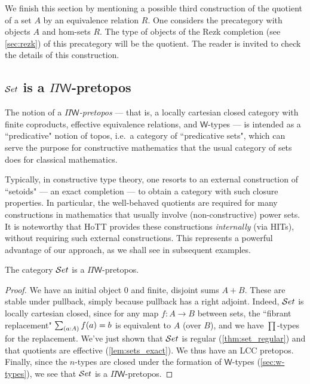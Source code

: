 We finish this section by mentioning a possible third construction of the quotient of a set $A$ by an equivalence relation $R$. One
considers the precategory with objects $A$ and hom-sets $R$. The type of objects of the Rezk completion (see \autoref{sec:rezk}) of this precategory will be the
quotient. The reader is invited to check the details of this construction.

\subsection{\texorpdfstring{$\mathcal{S}et$}{Set} is a \texorpdfstring{$\Pi\mathsf{W}$}{ΠW}-pretopos}
\label{subsec:piw}

The notion of a \emph{$\Pi\mathsf{W}$-pretopos} --- that is, a locally cartesian closed category with finite coproducts, effective equivalence relations, and $\mathsf{W}$-types --- is intended as a ``predicative" notion of topos, i.e.\ a category of ``predicative sets", which can serve the purpose for constructive mathematics that the usual category of sets does for classical mathematics.  

Typically, in constructive type theory, one resorts to an external construction of ``setoids" --- an exact completion --- to obtain a category with such closure properties.  In particular, the well-behaved quotients are required for many constructions in mathematics that usually involve (non-constructive) power sets.  It is noteworthy that HoTT  provides these constructions \emph{internally} (via HITs), without requiring such external constructions.  This represents a powerful advantage of our approach, as we shall see in subsequent examples.

\begin{thm} The category $\mathcal{S}et$ is a $\Pi\mathsf{W}$-pretopos.
\end{thm}
\begin{proof}
We have an initial object $0$ and finite, disjoint sums $A+B$.  These are stable under pullback, simply because pullback has a right adjoint.  Indeed, $\mathcal{S}et$ is locally cartesian closed, since for any map $f:A\to B$ between sets, the ``fibrant replacement" $\sm{a:A}f(a)=b$ is equivalent to $A$ (over $B$), and we have $\prod$-types for the replacement.
We've just shown that $\mathcal{S}et$ is regular (\autoref{thm:set_regular}) and that quotients are effective (\autoref{lem:sets_exact}). We thus have an LCC pretopos. Finally, since the $n$-types are closed under the formation of $\mathsf{W}$-types
(\autoref{sec:w-types}), we see that $\mathcal{S}et$ is a $\Pi\mathsf{W}$-pretopos. 
\end{proof}


